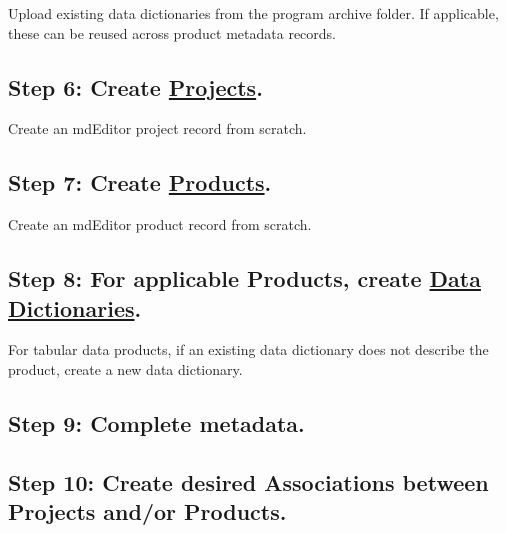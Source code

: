 \documentclass[
]{book}
\begin{document}
Upload existing data dictionaries from the program archive folder. If applicable, these can be reused across product metadata records.

\hypertarget{step-6-create-projects.}{%
\subsection{\texorpdfstring{Step 6: Create \protect\hyperlink{project-entry-guidance}{Projects}.}{Step 6: Create Projects.}}\label{step-6-create-projects.}}

Create an mdEditor project record from scratch.

\hypertarget{step-7-create-products.}{%
\subsection{\texorpdfstring{Step 7: Create \protect\hyperlink{product-entry-guidance}{Products}.}{Step 7: Create Products.}}\label{step-7-create-products.}}

Create an mdEditor product record from scratch.

\hypertarget{step-8-for-applicable-products-create-data-dictionaries.}{%
\subsection{\texorpdfstring{Step 8: For applicable Products, create \protect\hyperlink{dictionary-entry-guidance}{Data Dictionaries}.}{Step 8: For applicable Products, create Data Dictionaries.}}\label{step-8-for-applicable-products-create-data-dictionaries.}}

For tabular data products, if an existing data dictionary does not describe the product, create a new data dictionary.

\hypertarget{step-9-complete-metadata.}{%
\subsection{Step 9: Complete metadata.}\label{step-9-complete-metadata.}}

\hypertarget{step-10-create-desired-associations-between-projects-andor-products.}{%
\subsection{Step 10: Create desired Associations between Projects and/or Products.}\label{step-10-create-desired-associations-between-projects-andor-products.}}
\end{document}
